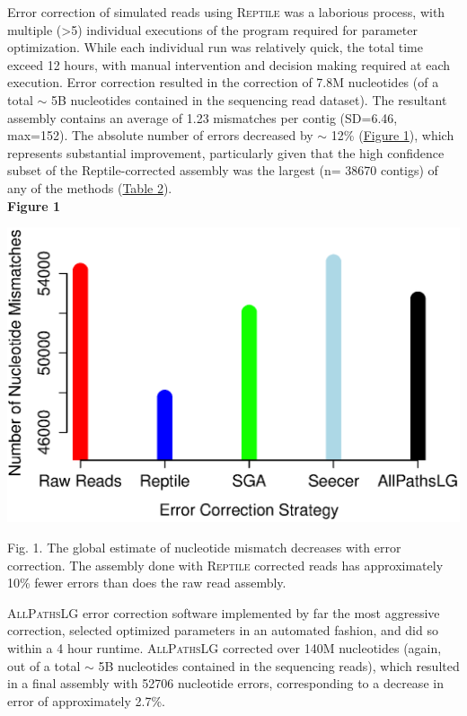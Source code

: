 \documentclass[11pt]{article}
\begin{document}
\noindent
Error correction of simulated reads using \textsc{Reptile} was a laborious process, with multiple (\textgreater 5) individual executions of the program required for parameter optimization. While each individual run was relatively quick, the total time exceed 12 hours, with manual intervention and decision making required at each execution.  Error correction resulted in the correction of 7.8M nucleotides (of a total $\sim$ 5B nucleotides contained in the sequencing read dataset). The resultant assembly contains an average of 1.23 mismatches per contig (SD=6.46, max=152).  The absolute number of errors decreased by $\sim$ 12\% (\hyperlink{Figure 1}{Figure 1}), which represents substantial improvement, particularly given that the high confidence subset of the Reptile-corrected assembly was the largest (n= 38670 contigs) of any of the methods (\hyperlink{Table 2}{Table 2}). \\

\textbf{\hypertarget{Figure 1}{Figure 1}} \\
\centerline{\includegraphics[width=12.0\baselineskip]{newfig2b.eps}}
\begin{changemargin}{2cm}{2cm}
\noindent
Fig. 1. The global estimate of nucleotide mismatch decreases with error correction. The assembly done with \textsc{Reptile} corrected reads has approximately 10\% fewer errors than does the raw read assembly. 
\end{changemargin}
\vspace{10mm}


\noindent
\textsc{AllPathsLG} error correction software implemented by far the most aggressive correction, selected optimized parameters in an automated fashion, and did so within a 4 hour runtime.  \textsc{AllPathsLG} corrected over 140M nucleotides (again, out of a total $\sim$ 5B nucleotides contained in the sequencing reads), which resulted in a final assembly with 52706 nucleotide errors, corresponding to a decrease in error of approximately 2.7\%.   \\
\end{document}
